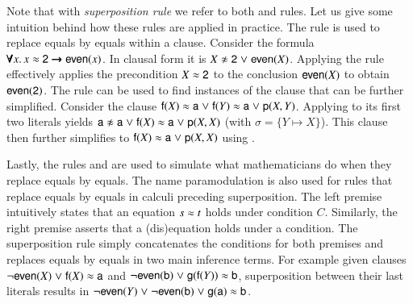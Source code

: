 \medskip
Note that with \emph{superposition rule} we refer to both  and 
rules.
Let us give some intuition behind how these rules are applied in practice. The
 rule is used to replace equals by equals within a clause.
Consider the formula $\pmb{\forall} x.\,  x \approx \mathsf{2} \pmb{\rightarrow} \mathsf{even}(x)$. In
clausal form it is $X \noteq \cst{2} \llor \cst{even}(X)$. Applying the
 rule effectively applies the precondition $X \approx \mathsf{2}$ to the
conclusion $\mathsf{even}(X)$ to obtain $\mathsf{even}(\mathsf{2})$. The 
rule can be used to find instances of the clause that can be further simplified.
Consider the clause $\mathsf{f}(X) \approx \mathsf{a} \mathrel\lor \mathsf{f}(Y) \approx \mathsf{a} \mathrel\lor
\mathsf{p}(X, Y)$. Applying  to its first two literals yields $\cst{a}
\noteq \cst{a} \llor \cst{f}(X) \eq \cst{a} \llor \cst{p}(X, X)$ (with $\sigma = \{ Y \mapsto X \}$). This clause
then further simplifies to $\mathsf{f}(X) \approx \mathsf{a} \mathrel\lor \mathsf{p}(X, X)$ using .

Lastly, the rules  and  are used to simulate what
mathematicians do when they replace equals by equals. The name paramodulation is
also used for rules that replace equals by equals in calculi preceding superposition.  The left premise intuitively
states that an equation $s \approx t$ holds under condition $C$. Similarly, the right premise asserts that a (dis)equation holds
under a condition. The superposition rule simply concatenates the conditions for
both premises and replaces equals by equals in two main inference terms. For
example given clauses $\neg \mathsf{even}(X) \mathrel\lor \mathsf{f}(X) \approx \mathsf{a}$ and
$\neg \mathsf{even}(\mathsf{b}) \mathrel\lor \mathsf{g}(\mathsf{f}(Y)) \approx \mathsf{b}$, superposition
between their last literals results in $\neg \mathsf{even}(Y) \mathrel\lor \neg
\mathsf{even}(\mathsf{b}) \mathrel\lor \mathsf{g}(\mathsf{a}) \approx \mathsf{b}$.




